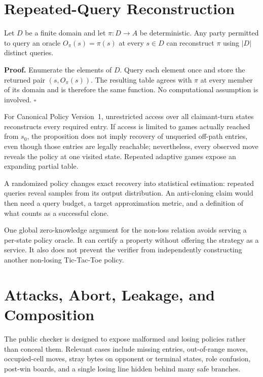 \section{Repeated-Query Reconstruction}
\label{sec:ttt-repeated-query}

\begin{proposition}
\label{prop:ttt-oracle-reconstruction}
Let $D$ be a finite domain and let $\pi:D\rightarrow A$ be deterministic.
Any party permitted to query an oracle $O_\pi(s)=\pi(s)$ at every $s\in D$
can reconstruct $\pi$ using $|D|$ distinct queries.
\end{proposition}

\textbf{Proof.}
Enumerate the elements of $D$. Query each element once and store the returned
pair $(s,O_\pi(s))$. The resulting table agrees with $\pi$ at every member
of its domain and is therefore the same function. No computational assumption
is involved. $\square$

For Canonical Policy Version~1, unrestricted access over all claimant-turn
states reconstructs every required entry. If access is limited to games
actually reached from $s_0$, the proposition does not imply recovery of
unqueried off-path entries, even though those entries are legally reachable;
nevertheless, every observed move reveals the policy at one visited state.
Repeated adaptive games expose an expanding partial table.

A randomized policy changes exact recovery into statistical estimation:
repeated queries reveal samples from its output distribution. An anti-cloning
claim would then need a query budget, a target approximation metric, and a
definition of what counts as a successful clone.

One global zero-knowledge argument for the non-loss relation avoids serving a
per-state policy oracle. It can certify a property without offering the
strategy as a service. It also does not prevent the verifier from independently
constructing another non-losing Tic-Tac-Toe policy.

\section{Attacks, Abort, Leakage, and Composition}
\label{sec:ttt-attacks}

The public checker is designed to expose malformed and losing policies rather
than conceal them. Relevant cases include missing entries, out-of-range moves,
occupied-cell moves, stray bytes on opponent or terminal states, role
confusion, post-win boards, and a single losing line hidden behind many safe
branches.

